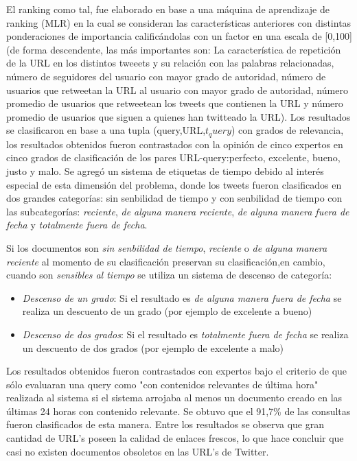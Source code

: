	El ranking como tal, fue elaborado en base a una máquina de aprendizaje de ranking (MLR) en la cual se consideran las características anteriores con distintas ponderaciones de importancia calificándolas con un factor en una escala de [0,100](de forma descendente, las más importantes son: La característica de repetición de la URL en los distintos tweeets y su relación con las palabras relacionadas, número de seguidores del usuario con mayor grado de autoridad, número de usuarios que retweetan la URL al usuario con  mayor grado de autoridad, número promedio de usuarios que retweetean los tweets que contienen la URL y número promedio de usuarios que siguen a quienes han twitteado la URL). Los resultados se clasificaron en base a una tupla (query,URL,$t_query$) con grados de relevancia, los resultados obtenidos fueron contrastados con la opinión de cinco expertos en cinco grados de clasificación de los pares URL-query:perfecto, excelente, bueno, justo y malo. Se agregó un sistema de etiquetas de tiempo debido al interés especial de esta dimensión del problema, donde los tweets fueron clasificados en dos grandes categorías: sin senbilidad de tiempo y con senbilidad de tiempo con las subcategorías: \emph{reciente}, \emph{de alguna manera reciente}, \emph{de alguna manera fuera de fecha} y \emph{totalmente fuera de fecha}.
	
	Si los documentos son \emph{sin senbilidad de tiempo}, \emph{reciente} o \emph{de alguna manera reciente} al momento de su clasificación preservan su clasificación,en cambio, cuando son \emph{sensibles al tiempo} se utiliza un sistema de descenso de categoría:
	
	\begin{itemize}
		\item \emph{Descenso de un grado}: Si el resultado es \emph{de alguna manera fuera de fecha} se realiza un descuento de un grado (por ejemplo de excelente a bueno)
		\item \emph{Descenso de dos grados}: Si el resultado es \emph{totalmente fuera de fecha} se realiza un descuento de dos grados (por ejemplo de excelente a malo)
	\end{itemize}
	
	Los resultados obtenidos fueron contrastados con expertos bajo el criterio de que sólo evaluaran una query como "con contenidos relevantes de última hora" realizada al sistema si el sistema arrojaba al menos un documento creado en las últimas 24 horas con contenido relevante. Se obtuvo que el 91,7\% de las consultas fueron clasificados de esta manera. Entre los resultados se observa que gran cantidad de URL's poseen la calidad de enlaces frescos, lo que hace concluir que casi no existen documentos obsoletos en las URL's de Twitter. 
	
